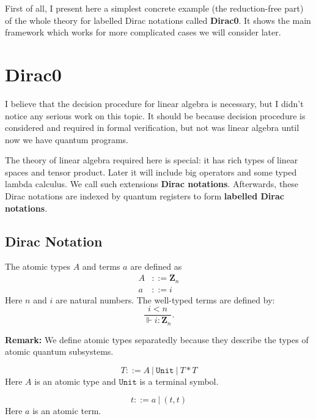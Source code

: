   
% 

First of all, I present here a simplest concrete example (the reduction-free part) of the whole theory for labelled Dirac notations called \textbf{Dirac0}. It shows the main framework which works for more complicated cases we will consider later.

\section{Dirac0}

I believe that the decision procedure for linear algebra is necessary, but I didn't notice any serious work on this topic. It should be because decision procedure is considered and required in formal verification, but not was linear algebra until now we have quantum programs. 

The theory of linear algebra required here is special: it has rich types of linear spaces and tensor product. Later it will include big operators and some typed lambda calculus. We call such extensions \textbf{Dirac notations}. Afterwards, these Dirac notations are indexed by quantum registers to form \textbf{labelled Dirac notations}.

\subsection{Dirac Notation}

\begin{definition}
  The atomic types $A$ and terms $a$ are defined as
  \begin{align*}
    A & ::= \mathbf{Z}_n \\
    a & ::= i
  \end{align*}
  Here $n$ and $i$ are natural numbers. The well-typed terms are defined by:
  $$
  \frac{i < n}{\Vdash i : \mathbf{Z}_n}.
  $$
\end{definition}
\textbf{Remark:} We define atomic types separatedly because they describe the types of atomic quantum subsystems.

\begin{definition} 
  $$
  T ::= A\ |\ \texttt{Unit}\ |\ T * T
  $$
  Here $A$ is an atomic type and $\texttt{Unit}$ is a terminal symbol.
\end{definition}

\begin{definition}
  $$
  t ::= a\ |\ (t, t)
  $$
  Here $a$ is an atomic term.
\end{definition}

